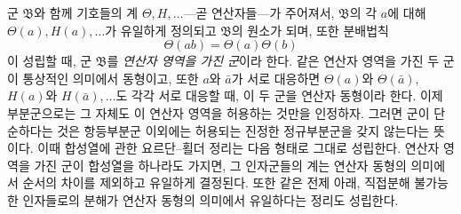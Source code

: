\documentclass[11pt]{article}
\begin{document}
군 $\mathfrak{B}$와 함께 기호들의 계 $\Theta,H,\ldots$---곧 연산자들---가 주어져서, $\mathfrak{B}$의 각 $a$에 대해 $\Theta(a),H(a),\ldots$가 유일하게 정의되고 $\mathfrak{B}$의 원소가 되며, 또한 분배법칙
\[
\Theta(ab)=\Theta(a)\Theta(b)
\]
이 성립할 때, 군 $\mathfrak{B}$를 \emph{연산자 영역을 가진 군}이라 한다. 같은 연산자 영역을 가진 두 군이 통상적인 의미에서 동형이고, 또한 $a$와 $\bar a$가 서로 대응하면 $\Theta(a)$와 $\Theta(\bar a)$, $H(a)$와 $H(\bar a),\ldots$도 각각 서로 대응할 때, 이 두 군을 연산자 동형이라 한다. 이제 부분군으로는 그 자체도 이 연산자 영역을 허용하는 것만을 인정하자. 그러면 군이 단순하다는 것은 항등부분군 이외에는 허용되는 진정한 정규부분군을 갖지 않는다는 뜻이다. 이때 합성열에 관한 요르단--횔더 정리는 다음 형태로 그대로 성립한다. 연산자 영역을 가진 군이 합성열을 하나라도 가지면, 그 인자군들의 계는 연산자 동형의 의미에서 순서의 차이를 제외하고 유일하게 결정된다. 또한 같은 전제 아래, 직접분해 불가능한 인자들로의 분해가 연산자 동형의 의미에서 유일하다는 정리도 성립한다.
\end{document}
